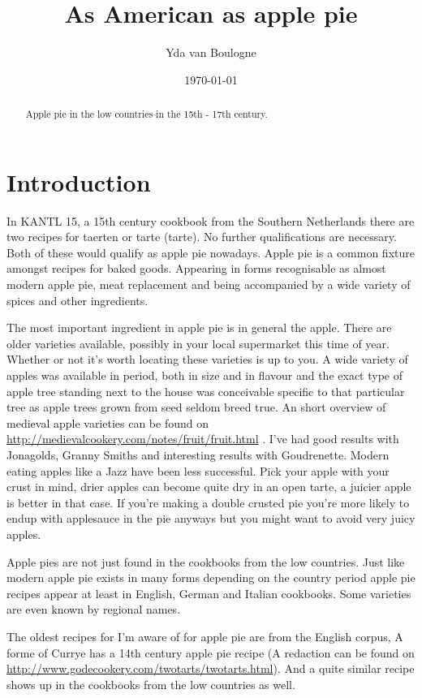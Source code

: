 \documentclass[a4paper]{article}
\title{As American as apple pie}
\author{Yda van Boulogne}
\date{\today}
\begin{document}
\maketitle

\begin{abstract}
Apple pie in the low countries in the 15th - 17th century.
\end{abstract}

\section{Introduction}
\label{sec:introduction}
In KANTL 15, a 15th century cookbook from the Southern Netherlands there are two recipes for taerten or tarte (tarte). No further qualifications are necessary. Both of these would qualify as apple pie nowadays. Apple pie is a common fixture amongst recipes for baked goods. Appearing in forms recognisable as almost modern apple pie, meat replacement and being accompanied by a wide variety of spices and other ingredients. 

The most important ingredient in apple pie is in general the apple. There are older varieties available, possibly in your local supermarket this time of year. Whether or not it’s worth locating these varieties is up to you. A wide variety of apples was available in period, both in size and in flavour and the exact type of apple tree standing next to the house was conceivable specific to that particular tree as apple trees grown from seed seldom breed true. An short overview of medieval apple varieties can be found on \url{http://medievalcookery.com/notes/fruit/fruit.html} . I’ve had good results with Jonagolds, Granny Smiths  and interesting results with Goudrenette. Modern eating apples like a Jazz have been less successful. Pick your apple with your crust in mind, drier apples can become quite dry in an open tarte, a juicier apple is better in that case. If you’re making a double crusted pie you’re more likely to endup with applesauce in the pie anyways but you might want to avoid very juicy apples. 

Apple pies are not just found in the cookbooks from the low countries. Just like modern apple pie exists in many forms depending on the country period apple pie recipes appear at least in English, German and Italian cookbooks. Some varieties are even known by regional names.

The oldest recipes for I’m aware of for apple pie are from the English corpus, A forme of Currye has a 14th century apple pie recipe (A redaction can be found on \url{http://www.godecookery.com/twotarts/twotarts.html}). And a quite similar recipe shows up in the cookbooks from the low countries as well. 
\end{document}
